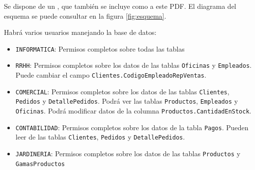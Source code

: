 Se dispone de un , que también se incluye como  a este PDF. El diagrama del esquema se puede consultar en la figura \ref{fig:esquema}.

Habrá varios usuarios manejando la base de datos:
\begin{itemize}
\item \texttt{INFORMATICA}: Permisos completos sobre todas las tablas
\item \texttt{RRHH}: Permisos completos sobre los datos de las tablas \texttt{Oficinas} y \texttt{Empleados}. Puede cambiar el campo \texttt{Clientes.CodigoEmpleadoRepVentas}.
\item \texttt{COMERCIAL}: Permisos completos sobre los datos de las tablas \texttt{Clientes}, \texttt{Pedidos} y \texttt{DetallePedidos}.  Podrá ver las tablas \texttt{Productos}, \texttt{Empleados} y \texttt{Oficinas}. Podrá modificar datos de la columna \texttt{Productos.CantidadEnStock}.
\item \texttt{CONTABILIDAD}: Permisos completos sobre los datos de la tabla \texttt{Pagos}. Pueden leer de las tablas \texttt{Clientes}, \texttt{Pedidos} y \texttt{DetallePedidos}.
\item \texttt{JARDINERIA}: Permisos completos sobre los datos de las tablas \texttt{Productos} y \texttt{GamasProductos}
\end{itemize}

